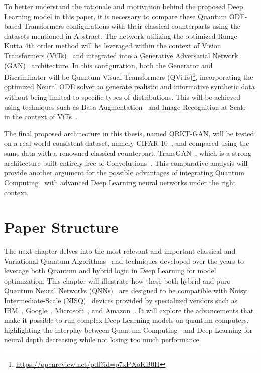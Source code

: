 \documentclass[12pt,a4paper]{report}
\begin{document}
To better understand the rationale and motivation behind the proposed Deep Learning model in this paper, it is necessary to compare these Quantum ODE-based Transformers configurations  with their classical counterparts using the datasets mentioned in Abstract. The network utilizing the optimized Runge-Kutta 4th order method will be leveraged within the context of Vision Transformers (ViTs)~\cite{vaswani2017attention, dosovitskiy2020} and integrated into a Generative Adversarial Network (GAN)~\cite{goodfellow2014generative} architecture. In this configuration, both the Generator and Discriminator will be Quantum Visual Transformers (QViTs)\footnote{\url{https://openreview.net/pdf?id=p7xPXoKB0H}}, incorporating the optimized Neural ODE solver to generate realistic and informative synthetic data without being limited to specific types of distributions. This will be achieved using techniques such as Data Augmentation~\cite{zhao2020diffaugment} and Image Recognition at Scale~\cite{dosovitskiy2020} in the context of ViTs~\cite{vaswani2017attention}.

The final proposed architecture in this thesis, named QRKT-GAN, will be tested on a real-world consistent dataset, namely CIFAR-10~\cite{Krizhevsky09learningmultiple}, and compared using the same data with a renowned classical counterpart, TransGAN~\cite{jiang2021transgan}, which is a strong architecture built entirely free of Convolutions~\cite{cordonnier2020relationship}. This comparative analysis will provide another argument for the possible advantages of integrating Quantum Computing~\cite{nielsen2001quantum} with advanced Deep Learning neural networks under the right context.
\section{Paper Structure}\vspace{-12pt}
The next chapter delves into the most relevant and important classical and Variational Quantum Algorithms~\cite{cerezo2021variational} and techniques developed over the years to leverage both Quantum and hybrid logic in Deep Learning for model optimization. This chapter will illustrate how these both hybrid and pure Quantum Neural Networks (QNNs)~\cite{breuckmann2018scalable} are designed to be compatible with Noisy Intermediate-Scale (NISQ)~\cite{lau2022nisq} devices provided by specialized vendors such as IBM~\cite{Santos_2016}, Google~\cite{kalai2023googles}, Microsoft~\cite{Mykhailova_2023}, and Amazon~\cite{Reyes_2021}. It will explore the advancements that make it possible to run complex Deep Learning models on quantum computers, highlighting the interplay between Quantum Computing~\cite{nielsen2001quantum} and Deep Learning for neural depth decreasing while not losing too much performance.
\end{document}
